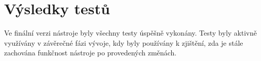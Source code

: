 	\section{Výsledky testů}
		Ve finální verzi nástroje byly všechny testy úspěšně vykonány. Testy byly aktivně využívány v závěrečné fázi vývoje, kdy byly používány k zjištění, zda je stále zachována funkčnost nástroje po provedených změnách. 
